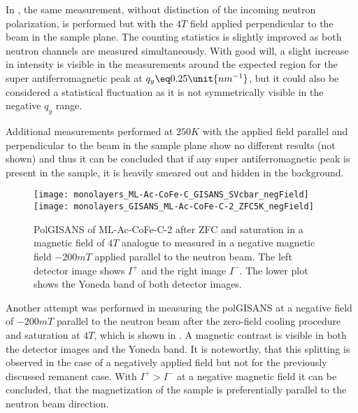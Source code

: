 \documentclass[\main/dresen_thesis.tex]{subfiles}
\begin{document}
  In , the same measurement, without distinction of the incoming neutron polarization, is performed but with the $4 \unit{T}$ field applied perpendicular to the beam in the sample plane.
  The counting statistics is slightly improved as both neutron channels are measured simultaneously.
  With good will, a slight increase in intensity is visible in the measurements around the expected region for the super antiferromagnetic peak at $q_y \eq 0.25 \unit{nm^{-1}}$, but it could also be considered a statistical fluctuation as it is not symmetrically visible in the negative $q_y$ range.
  
  Additional measurements performed at $250 \unit{K}$ with the applied field parallel and perpendicular to the beam in the sample plane show no different results (not shown) and thus it can be concluded that if any super antiferromagnetic peak is present in the sample, it is heavily smeared out and hidden in the background.

  
  \begin{figure}[tb]
    \centering
    \texttt{[image: monolayers\_ML-Ac-CoFe-C\_GISANS\_SVcbar\_negField]}
    \texttt{[image: monolayers\_GISANS\_ML-Ac-CoFe-C-2\_ZFC5K\_negField]}
    \caption{\label{fig:monolayer:magneticStructure:negativeField}PolGISANS of ML-Ac-CoFe-C-2 after ZFC and saturation in a magnetic field of $4 \unit{T}$ analogue to  measured in a negative magnetic field $-200 \unit{mT}$ applied parallel to the neutron beam. The left detector image shows $I^{+}$ and the right image $I^{-}$. The lower plot shows the Yoneda band of both detector images.}
  \end{figure}

  Another attempt was performed in measuring the polGISANS at a negative field of $-200 \unit{mT}$ parallel to the neutron beam after the zero-field cooling procedure and saturation at $4 \unit{T}$, which is shown in .
  A magnetic contrast is visible in both the detector images and the Yoneda band.
  It is noteworthy, that this splitting is observed in the case of a negatively applied field but not for the previously discussed remanent case.
  With $I^{+} > I^{-}$ at a negative magnetic field it can be concluded, that the magnetization of the sample is preferentially parallel to the neutron beam direction.
\end{document}
